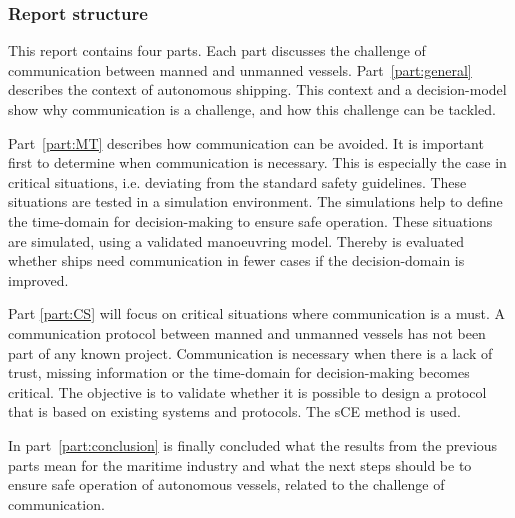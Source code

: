 \subsubsection*{Report structure}
This report contains four parts. Each part discusses the challenge of communication between manned and unmanned vessels. Part~\ref{part:general} describes the context of autonomous shipping. This context and a decision-model show why communication is a challenge, and how this challenge can be tackled.

Part~\ref{part:MT} describes how communication can be avoided. It is important first to determine when communication is necessary. This is especially the case in critical situations, i.e. deviating from the standard safety guidelines. These situations are tested in a simulation environment. The simulations help to define the time-domain for decision-making to ensure safe operation. These situations are simulated, using a validated manoeuvring model. Thereby is evaluated whether ships need communication in fewer cases if the decision-domain is improved.

Part \ref{part:CS} will focus on critical situations where communication is a must. A communication protocol between manned and unmanned vessels has not been part of any known project. Communication is necessary when there is a lack of trust, missing information or the time-domain for decision-making becomes critical. The objective is to validate whether it is possible to design a protocol that is based on existing systems and protocols. The \acf{sCE} method is used.

In part~\ref{part:conclusion} is finally concluded what the results from the previous parts mean for the maritime industry and what the next steps should be to ensure safe operation of autonomous vessels, related to the challenge of communication.
